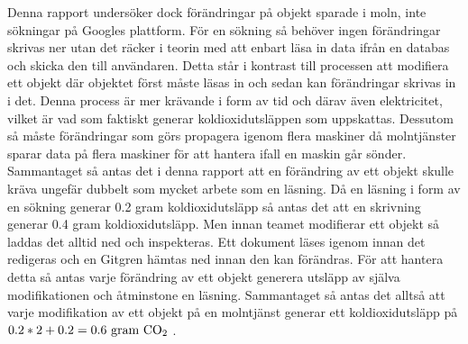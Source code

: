 Denna rapport undersöker dock förändringar på objekt sparade i moln, inte sökningar på Googles plattform. För en sökning så behöver ingen förändringar skrivas ner utan det räcker i teorin med att enbart läsa in data ifrån en databas och skicka den till användaren. Detta står i kontrast till processen att modifiera ett objekt där objektet först måste läsas in och sedan kan förändringar skrivas in i det. Denna process är mer krävande i form av tid och därav även elektricitet, vilket är vad som faktiskt generar koldioxidutsläppen som uppskattas. Dessutom så måste förändringar som görs propagera igenom flera maskiner då molntjänster sparar data på flera maskiner för att hantera ifall en maskin går sönder. Sammantaget så antas det i denna rapport att en förändring av ett objekt skulle kräva ungefär dubbelt som mycket arbete som en läsning. Då en läsning i form av en sökning generar 0.2 gram koldioxidutsläpp så antas det att en skrivning generar 0.4 gram koldioxidutsläpp. Men innan teamet modifierar ett objekt så laddas det alltid ned och inspekteras. Ett dokument läses igenom innan det redigeras och en Gitgren hämtas ned innan den kan förändras. För att hantera detta så antas varje förändring av ett objekt generera utsläpp av själva modifikationen och åtminstone en läsning. Sammantaget så antas det alltså att varje modifikation av ett objekt på en molntjänst generar ett koldioxidutsläpp på  $0.2 * 2 + 0.2 = 0.6 \text{ gram \ce{CO2} }$.